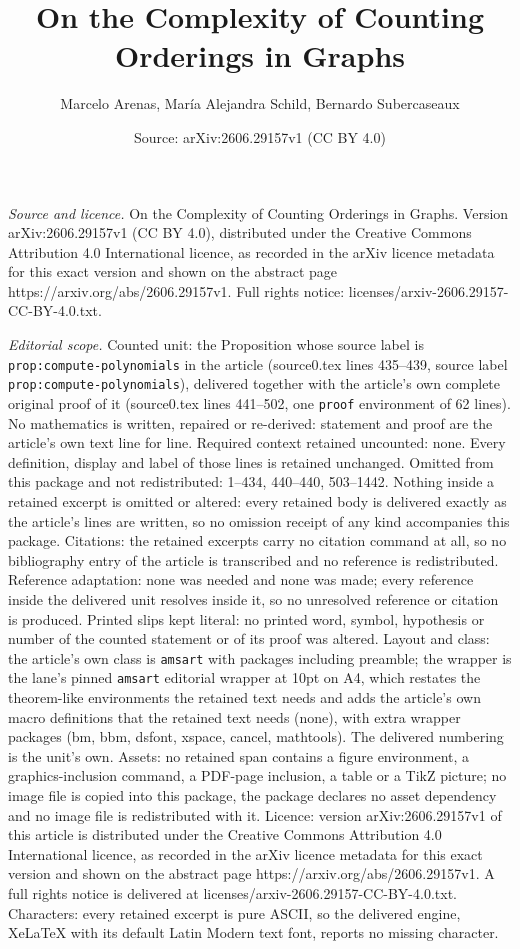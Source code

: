 \documentclass[10pt,a4paper]{amsart}
\title[On the Complexity of Counting Orderings in Graphs]{On the Complexity of Counting Orderings in Graphs}
\author{Marcelo Arenas, Mar\'ia Alejandra Schild, Bernardo Subercaseaux}
\date{Source: arXiv:2606.29157v1 (CC BY 4.0)}
\begin{document}
\maketitle

\noindent\emph{Source and licence.} On the Complexity of Counting Orderings in Graphs. Version arXiv:2606.29157v1 (CC BY 4.0), distributed under the Creative Commons Attribution 4.0 International licence, as recorded in the arXiv licence metadata for this exact version and shown on the abstract page https://arxiv.org/abs/2606.29157v1. Full rights notice: licenses/arxiv-2606.29157-CC-BY-4.0.txt.\par\smallskip

\noindent\textit{Editorial scope.} Counted unit: the Proposition whose source label is \texttt{prop:compute-polynomials} in the article (source0.tex lines 435--439, source label \texttt{prop:compute-polynomials}), delivered together with the article's own complete original proof of it (source0.tex lines 441--502, one \texttt{proof} environment of 62 lines). No mathematics is written, repaired or re-derived: statement and proof are the article's own text line for line. Required context retained uncounted: none. Every definition, display and label of those lines is retained unchanged. Omitted from this package and not redistributed: 1--434, 440--440, 503--1442. Nothing inside a retained excerpt is omitted or altered: every retained body is delivered exactly as the article's lines are written, so no omission receipt of any kind accompanies this package. Citations: the retained excerpts carry no citation command at all, so no bibliography entry of the article is transcribed and no reference is redistributed. Reference adaptation: none was needed and none was made; every reference inside the delivered unit resolves inside it, so no unresolved reference or citation is produced. Printed slips kept literal: no printed word, symbol, hypothesis or number of the counted statement or of its proof was altered. Layout and class: the article's own class is \texttt{amsart} with packages including preamble; the wrapper is the lane's pinned \texttt{amsart} editorial wrapper at 10pt on A4, which restates the theorem-like environments the retained text needs and adds the article's own macro definitions that the retained text needs (none), with extra wrapper packages (bm, bbm, dsfont, xspace, cancel, mathtools). The delivered numbering is the unit's own. Assets: no retained span contains a figure environment, a graphics-inclusion command, a PDF-page inclusion, a table or a TikZ picture; no image file is copied into this package, the package declares no asset dependency and no image file is redistributed with it. Licence: version arXiv:2606.29157v1 of this article is distributed under the Creative Commons Attribution 4.0 International licence, as recorded in the arXiv licence metadata for this exact version and shown on the abstract page https://arxiv.org/abs/2606.29157v1. A full rights notice is delivered at licenses/arxiv-2606.29157-CC-BY-4.0.txt. Characters: every retained excerpt is pure ASCII, so the delivered engine, XeLaTeX with its default Latin Modern text font, reports no missing character.
\end{document}
